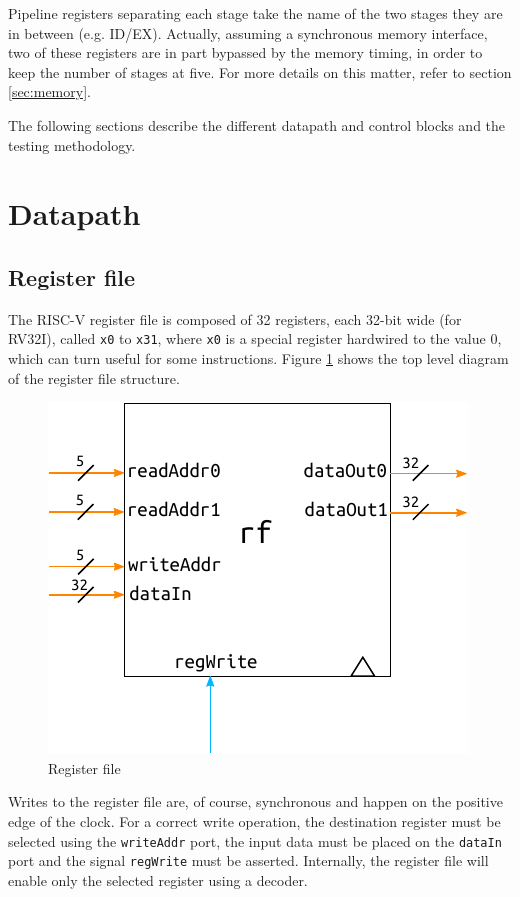 \documentclass[a4paper]{article}
\begin{document}
Pipeline registers separating each stage take the name of the two stages they are in between (e.g. ID/EX). Actually, assuming a synchronous memory interface, two of these registers are in part bypassed by the memory timing, in order to keep the number of stages at five. For more details on this matter, refer to section \ref{sec:memory}.

The following sections describe the different datapath and control blocks and the testing methodology.

\section{Datapath}
\subsection{Register file}
The RISC-V register file is composed of 32 registers, each 32-bit wide (for RV32I), called \texttt{x0} to \texttt{x31}, where \texttt{x0} is a special register hardwired to the value 0, which can turn useful for some instructions. Figure \ref{fig:rf} shows the top level diagram of the register file structure.

\begin{figure}[hbtp]
    \centering
    \includegraphics[scale=1]{../register_file/ref/schematic/register_file.pdf}
    \caption{Register file}
    \label{fig:rf}
\end{figure}

Writes to the register file are, of course, synchronous and happen on the positive edge of the clock. For a correct write operation, the destination register must be selected using the \texttt{writeAddr} port, the input data must be placed on the \texttt{dataIn} port and the signal \texttt{regWrite} must be asserted. Internally, the register file will enable only the selected register using a decoder.
\end{document}
